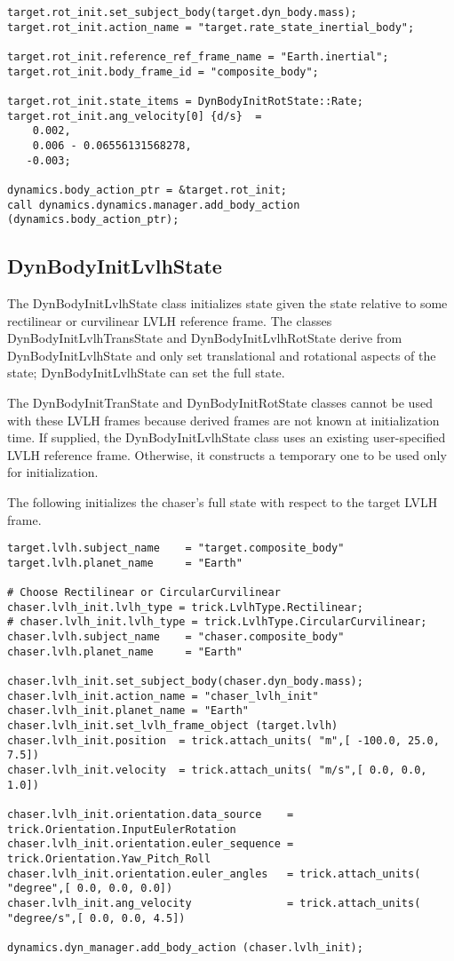 \begin{verbatim}
target.rot_init.set_subject_body(target.dyn_body.mass);
target.rot_init.action_name = "target.rate_state_inertial_body";

target.rot_init.reference_ref_frame_name = "Earth.inertial";
target.rot_init.body_frame_id = "composite_body";

target.rot_init.state_items = DynBodyInitRotState::Rate;
target.rot_init.ang_velocity[0] {d/s}  =
    0.002,
    0.006 - 0.06556131568278,
   -0.003;

dynamics.body_action_ptr = &target.rot_init;
call dynamics.dynamics.manager.add_body_action (dynamics.body_action_ptr);
\end{verbatim}


\subsection{DynBodyInitLvlhState}
The DynBodyInitLvlhState class initializes state
given the state relative to some rectilinear or curvilinear LVLH
reference frame. The classes DynBodyInitLvlhTransState and
DynBodyInitLvlhRotState derive from DynBodyInitLvlhState and only set
translational and rotational aspects of the state; DynBodyInitLvlhState
can set the full state.

The DynBodyInitTranState and DynBodyInitRotState classes cannot
be used with these LVLH frames because derived frames
are not known at initialization time. If supplied, the DynBodyInitLvlhState class
uses an existing user-specified LVLH reference frame. Otherwise, it constructs
a temporary one to be used only for initialization.

The following initializes the chaser's full state with respect to the
target LVLH frame.

\begin{verbatim}
target.lvlh.subject_name    = "target.composite_body"
target.lvlh.planet_name     = "Earth"

# Choose Rectilinear or CircularCurvilinear
chaser.lvlh_init.lvlh_type = trick.LvlhType.Rectilinear;
# chaser.lvlh_init.lvlh_type = trick.LvlhType.CircularCurvilinear;
chaser.lvlh.subject_name    = "chaser.composite_body"
chaser.lvlh.planet_name     = "Earth"

chaser.lvlh_init.set_subject_body(chaser.dyn_body.mass);
chaser.lvlh_init.action_name = "chaser_lvlh_init"
chaser.lvlh_init.planet_name = "Earth"
chaser.lvlh_init.set_lvlh_frame_object (target.lvlh)
chaser.lvlh_init.position  = trick.attach_units( "m",[ -100.0, 25.0, 7.5])
chaser.lvlh_init.velocity  = trick.attach_units( "m/s",[ 0.0, 0.0, 1.0])

chaser.lvlh_init.orientation.data_source    = trick.Orientation.InputEulerRotation
chaser.lvlh_init.orientation.euler_sequence = trick.Orientation.Yaw_Pitch_Roll
chaser.lvlh_init.orientation.euler_angles   = trick.attach_units( "degree",[ 0.0, 0.0, 0.0])
chaser.lvlh_init.ang_velocity               = trick.attach_units( "degree/s",[ 0.0, 0.0, 4.5])

dynamics.dyn_manager.add_body_action (chaser.lvlh_init);
\end{verbatim}



